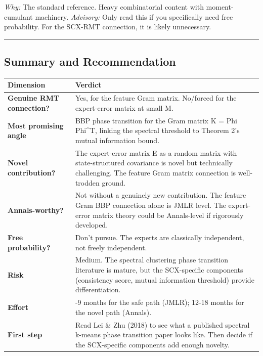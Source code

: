 \documentclass[
  12pt,
]{article}
\begin{document}
\emph{Why:} The standard reference. Heavy combinatorial content with
moment-cumulant machinery. \emph{Advisory:} Only read this if you
specifically need free probability. For the SCX-RMT connection, it is
likely unnecessary.

\begin{center}\rule{0.5\linewidth}{0.5pt}\end{center}

\subsection{Summary and
Recommendation}\label{summary-and-recommendation}

\begin{longtable}[]{@{}
  >{\raggedright\arraybackslash}p{}
  >{\raggedright\arraybackslash}p{}@{}}
\toprule\noalign{}
\begin{minipage}[b]{\linewidth}\raggedright
Dimension
\end{minipage} & \begin{minipage}[b]{\linewidth}\raggedright
Verdict
\end{minipage} \\
\midrule\noalign{}
\endhead
\bottomrule\noalign{}
\endlastfoot
\textbf{Genuine RMT connection?} & Yes, for the feature Gram matrix.
No/forced for the expert-error matrix at small M. \\
\textbf{Most promising angle} & BBP phase transition for the Gram matrix
K = Phi Phi\^{}T, linking the spectral threshold to Theorem 2's mutual
information bound. \\
\textbf{Novel contribution?} & The expert-error matrix E as a random
matrix with state-structured covariance is novel but technically
challenging. The feature Gram matrix connection is well-trodden
ground. \\
\textbf{Annals-worthy?} & Not without a genuinely new contribution. The
feature Gram BBP connection alone is JMLR level. The expert-error matrix
theory could be Annals-level if rigorously developed. \\
\textbf{Free probability?} & Don't pursue. The experts are classically
independent, not freely independent. \\
\textbf{Risk} & Medium. The spectral clustering phase transition
literature is mature, but the SCX-specific components (consistency
score, mutual information threshold) provide differentiation. \\
\textbf{Effort} & 6-9 months for the safe path (JMLR); 12-18 months for
the novel path (Annals). \\
\textbf{First step} & Read Lei \& Zhu (2018) to see what a published
spectral k-means phase transition paper looks like. Then decide if the
SCX-specific components add enough novelty. \\
\end{longtable}
\end{document}
